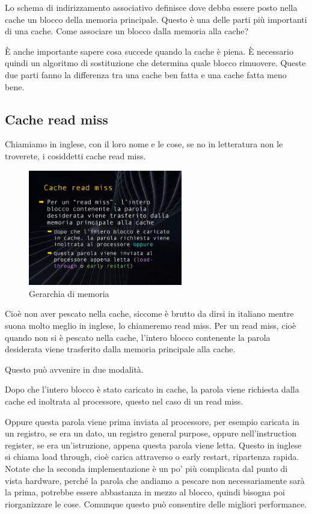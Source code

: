 Lo schema di indirizzamento associativo definisce dove debba essere posto nella cache un blocco della memoria principale. Questo è una delle parti più importanti di una cache. Come associare un blocco dalla memoria alla cache?

È anche importante sapere cosa succede quando la cache è piena. È necessario quindi un algoritmo di sostituzione che determina quale blocco rimuovere. Queste due parti fanno la differenza tra una cache ben fatta e una cache fatta meno bene.

\subsection{Cache read miss}

Chiamiamo in inglese, con il loro nome e le cose, se no in letteratura non le troverete, i cosiddetti cache read miss.

\FloatBarrier
\begin{figure}[H]
  \centering
  \includegraphics[width=0.60\textwidth,
                    trim=20 40 10 40, %
                    clip]
                    {images/Lez06_p03_fig_05.png}
  \caption{Gerarchia di memoria}
  \label{fig:Lez06_p03_fig_05}
\end{figure}
\FloatBarrier
\noindent


Cioè non aver pescato nella cache, siccome è brutto da dirsi in italiano mentre suona molto meglio in inglese, lo chiameremo read miss. Per un read miss, cioè quando non si è pescato nella cache, l'intero blocco contenente la parola desiderata viene trasferito dalla memoria principale alla cache.

Questo può avvenire in due modalità.

Dopo che l'intero blocco è stato caricato in cache, la parola viene richiesta dalla cache ed inoltrata al processore, questo nel caso di un read miss.

Oppure questa parola viene prima inviata al processore, per esempio caricata in un registro, se era un dato, un registro general purpose, oppure nell'instruction register, se era un'istruzione, appena questa parola viene letta. Questo in inglese si chiama load through, cioè carica attraverso o early restart, ripartenza rapida. Notate che la seconda implementazione è un po' più complicata dal punto di vista hardware, perché la parola che andiamo a pescare non necessariamente sarà la prima, potrebbe essere abbastanza in mezzo al blocco, quindi bisogna poi riorganizzare le cose. Comunque questo può consentire delle migliori performance.

